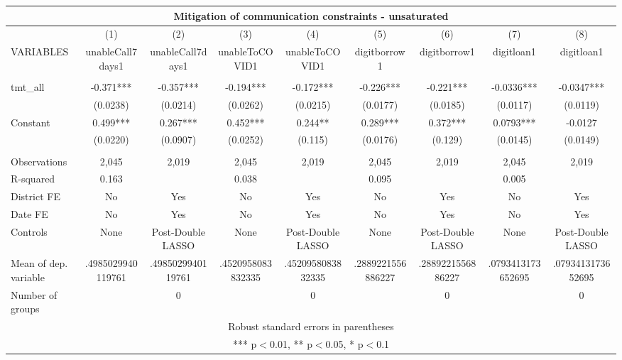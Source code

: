 \documentclass[]{article}
\begin{document}
\begin{tabular}{lcccccccc}
\multicolumn{9}{c}{Mitigation of communication constraints - unsaturated} \\ \hline
 & (1) & (2) & (3) & (4) & (5) & (6) & (7) & (8) \\
VARIABLES & unableCall7days1 & unableCall7days1 & unableToCOVID1 & unableToCOVID1 & digitborrow1 & digitborrow1 & digitloan1 & digitloan1 \\ \hline
 &  &  &  &  &  &  &  &  \\
tmt\_all & -0.371*** & -0.357*** & -0.194*** & -0.172*** & -0.226*** & -0.221*** & -0.0336*** & -0.0347*** \\
 & (0.0238) & (0.0214) & (0.0262) & (0.0215) & (0.0177) & (0.0185) & (0.0117) & (0.0119) \\
Constant & 0.499*** & 0.267*** & 0.452*** & 0.244** & 0.289*** & 0.372*** & 0.0793*** & -0.0127 \\
 & (0.0220) & (0.0907) & (0.0252) & (0.115) & (0.0176) & (0.129) & (0.0145) & (0.0149) \\
 &  &  &  &  &  &  &  &  \\
Observations & 2,045 & 2,019 & 2,045 & 2,019 & 2,045 & 2,019 & 2,045 & 2,019 \\
R-squared & 0.163 &  & 0.038 &  & 0.095 &  & 0.005 &  \\
District FE & No & Yes & No & Yes & No & Yes & No & Yes \\
Date FE & No & Yes & No & Yes & No & Yes & No & Yes \\
Controls & None & Post-Double LASSO & None & Post-Double LASSO & None & Post-Double LASSO & None & Post-Double LASSO \\
Mean of dep. variable & .4985029940119761 & .4985029940119761 & .4520958083832335 & .4520958083832335 & .2889221556886227 & .2889221556886227 & .0793413173652695 & .0793413173652695 \\
 Number of groups &  & 0 &  & 0 &  & 0 &  & 0 \\ \hline
\multicolumn{9}{c}{ Robust standard errors in parentheses} \\
\multicolumn{9}{c}{ *** p$<$0.01, ** p$<$0.05, * p$<$0.1} \\
\end{tabular}
\end{document}
